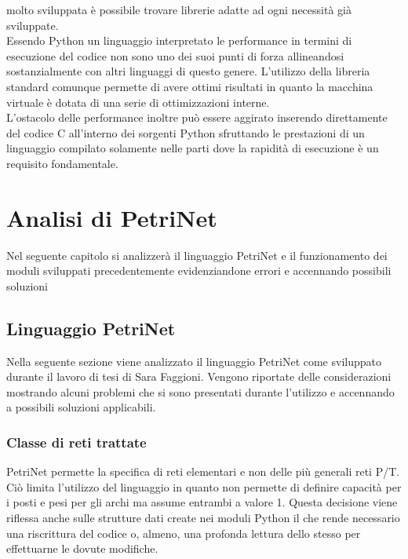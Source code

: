 \documentclass[italian,12pt]{book}
\begin{document}
molto sviluppata è possibile trovare librerie adatte ad ogni necessità già sviluppate. \\
Essendo Python un linguaggio interpretato le performance in termini di esecuzione del codice 
non sono uno dei suoi punti di forza allineandosi sostanzialmente con altri linguaggi di questo 
genere. L'utilizzo della libreria standard comunque permette di avere ottimi risultati in quanto
la macchina virtuale è dotata di una serie di ottimizzazioni interne. \\
L'ostacolo delle performance inoltre può essere aggirato inserendo direttamente del codice 
C all'interno dei sorgenti Python sfruttando le prestazioni di un linguaggio compilato 
solamente nelle parti dove la rapidità di esecuzione è un requisito fondamentale.


\chapter{Analisi di PetriNet}\label{cha:analisi_petrinet}
Nel seguente capitolo si analizzerà il linguaggio PetriNet e il funzionamento
dei moduli sviluppati precedentemente evidenziandone errori e accennando possibili soluzioni

\section{Linguaggio PetriNet}\label{sec:linguaggio_petrinet}
Nella seguente sezione viene analizzato il linguaggio PetriNet come sviluppato durante il lavoro 
di tesi di Sara Faggioni.
 Vengono riportate delle considerazioni mostrando alcuni problemi che si sono presentati durante
 l'utilizzo e accennando a possibili soluzioni applicabili.

\subsection{Classe di reti trattate}
PetriNet permette la specifica di reti elementari e non delle più generali reti P/T.
Ciò limita l'utilizzo del linguaggio in quanto non permette di definire capacità per i posti
e pesi per gli archi ma assume entrambi a valore 1. Questa decisione viene riflessa anche sulle 
strutture dati create nei moduli Python il che rende necessario una riscrittura del codice o, almeno, 
una profonda lettura dello stesso per effettuarne le dovute modifiche. \\
\end{document}

